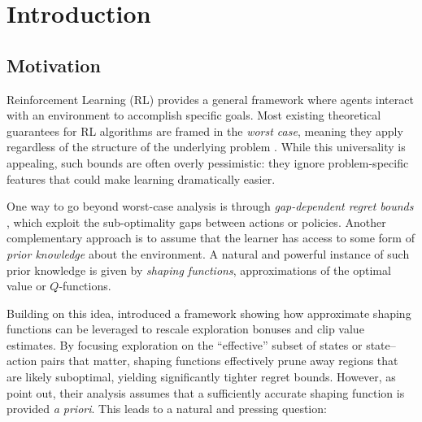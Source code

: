 \documentclass[twoside]{article}
\begin{document}
\section{Introduction}

%  

%  

\subsection{Motivation}


\noindent
Reinforcement Learning (RL) provides a general framework where agents interact with an environment to accomplish specific goals. Most existing theoretical guarantees for RL algorithms are framed in the \emph{worst case}, meaning they apply regardless of the structure of the underlying problem \citep{azar_minimax_2017,jin2018q,russo2019worst,zhang2024settling}. While this universality is appealing, such bounds are often overly pessimistic: they ignore problem-specific features that could make learning dramatically easier.

One way to go beyond worst-case analysis is through \emph{gap-dependent regret bounds} \citep{simchowitz2019non,zanette2019tighter}, which exploit the sub-optimality gaps between actions or policies. Another complementary approach is to assume that the learner has access to some form of \emph{prior knowledge} about the environment. A natural and powerful instance of such prior knowledge is given by \emph{shaping functions}, approximations of the optimal value or $Q$-functions.


Building on this idea, \cite{gupta_unpacking_2022} introduced a framework showing how approximate shaping functions can be leveraged to rescale exploration bonuses and clip value estimates. By focusing exploration on the “effective” subset of states or state–action pairs that matter, shaping functions effectively prune away regions that are likely suboptimal, yielding significantly tighter regret bounds. However, as \cite{gupta_unpacking_2022} point out, their analysis assumes that a sufficiently accurate shaping function is provided \emph{a priori}. This leads to a natural and pressing question:
\end{document}
